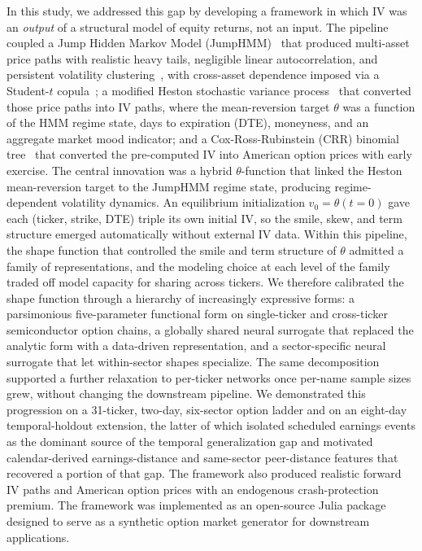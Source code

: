 In this study, we addressed this gap by developing a framework in which IV was an \emph{output} of a structural model of equity returns, not an input. The pipeline coupled a Jump Hidden Markov Model (JumpHMM)~\cite{jumphmm2025} that produced multi-asset price paths with realistic heavy tails, negligible linear autocorrelation, and persistent volatility clustering~\cite{cont2001}, with cross-asset dependence imposed via a Student-$t$ copula~\cite{demarta2005}; a modified Heston stochastic variance process~\cite{heston1993} that converted those price paths into IV paths, where the mean-reversion target $\theta$ was a function of the HMM regime state, days to expiration (DTE), moneyness, and an aggregate market mood indicator; and a Cox-Ross-Rubinstein (CRR) binomial tree~\cite{cox1979} that converted the pre-computed IV into American option prices with early exercise. The central innovation was a hybrid $\theta$-function that linked the Heston mean-reversion target to the JumpHMM regime state, producing regime-dependent volatility dynamics. An equilibrium initialization $v_0 = \theta(t\!=\!0)$ gave each (ticker, strike, DTE) triple its own initial IV, so the smile, skew, and term structure emerged automatically without external IV data. Within this pipeline, the shape function that controlled the smile and term structure of $\theta$ admitted a family of representations, and the modeling choice at each level of the family traded off model capacity for sharing across tickers. We therefore calibrated the shape function through a hierarchy of increasingly expressive forms: a parsimonious five-parameter functional form on single-ticker and cross-ticker semiconductor option chains, a globally shared neural surrogate that replaced the analytic form with a data-driven representation, and a sector-specific neural surrogate that let within-sector shapes specialize. The same decomposition supported a further relaxation to per-ticker networks once per-name sample sizes grew, without changing the downstream pipeline. We demonstrated this progression on a 31-ticker, two-day, six-sector option ladder and on an eight-day temporal-holdout extension, the latter of which isolated scheduled earnings events as the dominant source of the temporal generalization gap and motivated calendar-derived earnings-distance and same-sector peer-distance features that recovered a portion of that gap. The framework also produced realistic forward IV paths and American option prices with an endogenous crash-protection premium. The framework was implemented as an open-source Julia package designed to serve as a synthetic option market generator for downstream applications.
